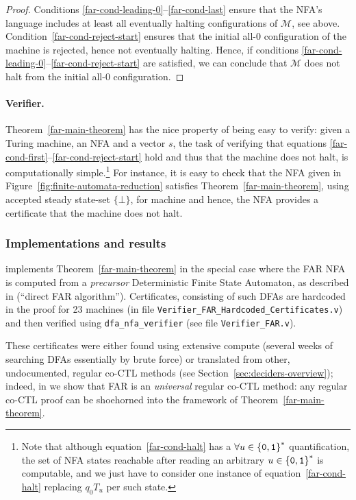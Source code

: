 \begin{proof}
    Conditions \eqref{far-cond-leading-0}--\eqref{far-cond-last} ensure that the NFA's language includes at least all eventually halting configurations of $\mathcal{M}$, see above. Condition~\eqref{far-cond-reject-start} ensures that the initial all-0 configuration of the machine is rejected, hence not eventually halting. Hence, if conditions \eqref{far-cond-leading-0}--\eqref{far-cond-reject-start} are satisfied, we can conclude that $\mathcal{M}$ does not halt from the initial all-0 configuration.
\end{proof}

\paragraph{Verifier.} Theorem~\ref{far-main-theorem} has the nice property of being easy to verify: given a Turing machine, an NFA and a vector $s$, the task of verifying that equations \eqref{far-cond-first}--\eqref{far-cond-reject-start} hold and thus that the machine does not halt, is computationally simple.\footnote{Note that although equation~\eqref{far-cond-halt} has a $\forall u\in\left\{\texttt{0},\texttt{1}\right\}^*$ quantification, the set of NFA states reachable after reading an arbitrary $u \in \left\{\texttt{0},\texttt{1}\right\}^*$ is computable, and we just have to consider one instance of equation~\eqref{far-cond-halt} replacing $q_0 T_u$ per such state.} For instance, it is easy to check that the NFA given in Figure~\ref{fig:finite-automata-reduction} satisfies Theorem~\ref{far-main-theorem}, using accepted steady state-set $\{\bot\}$, for machine  and hence, the NFA provides a certificate that the machine does not halt.



\subsubsection{Implementations and results}\label{sec:FAR:results}

\CoqBB implements Theorem~\ref{far-main-theorem} in the special case where the FAR NFA is computed from a \textit{precursor} Deterministic Finite State Automaton, as described in \cite{bbchallenge_part1} (``direct FAR algorithm''). Certificates, consisting of such DFAs are hardcoded in the proof for 23 machines (in file \texttt{Verifier\_FAR\_Hardcoded\_Certificates.v}) and then verified using \texttt{dfa\_nfa\_verifier} (see file \texttt{Verifier\_FAR.v}).

These certificates were either found using extensive compute (\eg several weeks of searching DFAs essentially by brute force) or translated from other, undocumented, regular co-CTL methods (see Section~\ref{sec:deciders-overview}); indeed, in \cite{bbchallenge_part1} we show that FAR is an \textit{universal} regular co-CTL method: any regular co-CTL proof can be shoehorned into the framework of Theorem~\ref{far-main-theorem}.

